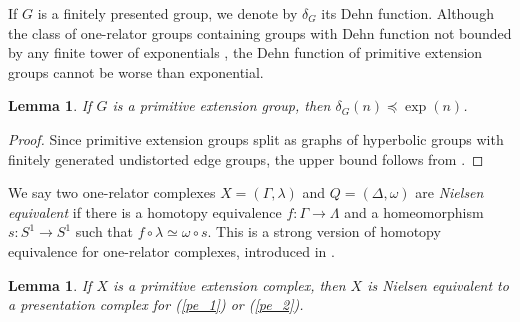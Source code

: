 \documentclass[11pt, a4paper]{amsart}
\newtheorem{lemma}[theorem]{Lemma}
\theoremstyle{definition}
\begin{document}
If $G$ is a finitely presented group, we denote by $\delta_G$ its Dehn function. Although the class of one-relator groups containing groups with Dehn function not bounded by any finite tower of exponentials \cite{gersten_92_l1}, the Dehn function of primitive extension groups cannot be worse than exponential.

\begin{lemma}
If $G$ is a primitive extension group, then $\delta_G(n)\preceq \exp(n)$.
\end{lemma}

\begin{proof}
Since primitive extension groups split as graphs of hyperbolic groups with finitely generated undistorted edge groups, the upper bound follows from \cite[Theorem 2]{bernasconi_94}.
\end{proof}

We say two one-relator complexes $X = (\Gamma, \lambda)$ and $Q = (\Delta, \omega)$ are \emph{Nielsen equivalent} if there is a homotopy equivalence $f:\Gamma\to \Lambda$ and a homeomorphism $s:S^1\to S^1$ such that $f\circ \lambda \simeq \omega\circ s$. This is a strong version of homotopy equivalence for one-relator complexes, introduced in \cite{louder_21}.

\begin{lemma}
\label{nielsen_equivalent}
If $X$ is a primitive extension complex, then $X$ is Nielsen equivalent to a presentation complex for (\ref{pe_1}) or (\ref{pe_2}).
\end{lemma}
\end{document}
